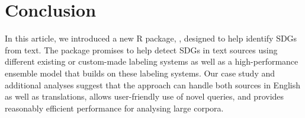  \section{Conclusion}
In this article, we introduced a new R package, , designed to help identify SDGs from text. The package promises to help detect SDGs in text sources using different existing or custom-made labeling systems as well as a high-performance ensemble model that builds on these labeling systems. Our case study and additional analyses suggest that the approach can handle both sources in English as well as translations, allows user-friendly use of novel queries, and provides reasonably efficient performance for analysing large corpora. 




\address{Dominik S. Meier\\
  University of Basel\\
  Steinengraben 22 4051 Basel\\
  Switzerland\\
  (ORCID: 0000-0002-3999-1388)\\
  }

\address{Rui Mata\\
  University of Basel\\
  Missionsstrasse 60-62 4055 Basel\\
  Switzerland\\
  (ORCID: 0000-0002-1679-906X)\\
  }
  
\address{Dirk U. Wulff\\
  University of Basel\\
  Missionsstrasse 60-62 4055 Basel\\
  Switzerland\\
  (ORCID: 0000-0002-4008-8022)\\
  }

